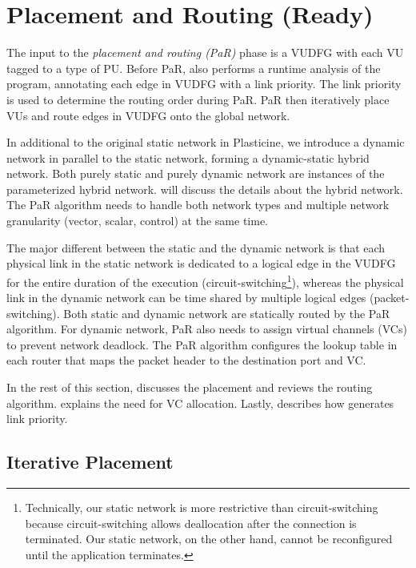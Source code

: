 \section{Placement and Routing (Ready)} \label{sec:par}
The input to the \emph{placement and routing (PaR)} phase is a VUDFG with each VU tagged to a type of PU.
Before PaR, \name also performs a runtime analysis of the program, annotating each edge in VUDFG
with a link priority. The link priority is used to determine the routing order during PaR.
PaR then iteratively place VUs and route edges in VUDFG onto the global network.

In additional to the original static network in Plasticine, we introduce a dynamic network in
parallel to the static network, forming a dynamic-static hybrid network.
Both purely static and purely dynamic network are instances of the parameterized hybrid network.
 will discuss the details about the hybrid network.
The PaR algorithm needs to handle both network types and multiple network granularity (vector,
scalar, control) at the same time.

The major different between the static and the dynamic network is that each physical link in the static
network is dedicated to a logical edge in the VUDFG for the entire duration of the execution
(circuit-switching\footnote{Technically, our static network is more restrictive than
circuit-switching because circuit-switching allows deallocation after the connection is terminated.
Our static network, on the other hand, cannot be reconfigured until the application terminates.}), whereas 
the physical link in the dynamic network can be time shared by multiple logical edges
(packet-switching).
Both static and dynamic network are statically routed by the PaR algorithm. 
For dynamic network, PaR also needs to assign virtual channels (VCs) to prevent network deadlock.
The PaR algorithm configures the lookup table in each router that maps the packet header to the
destination port and VC.

In the rest of this section,  discusses the placement and 
reviews the routing algorithm.  explains the need for VC allocation. Lastly,
 describes how \name generates link priority.

\subsection{Iterative Placement} \label{sec:place}

